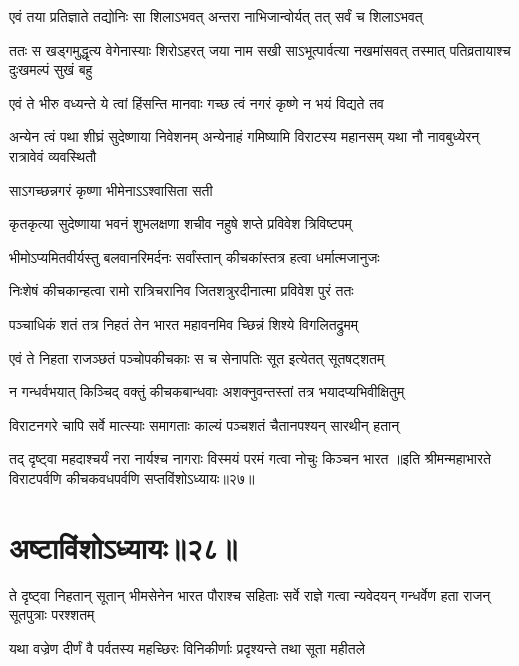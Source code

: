 \twolineshloka
{एवं तया प्रतिज्ञाते तद्योनिः सा शिलाऽभवत्}
{अन्तरा नाभिजान्वोर्यत् तत् सर्वं च शिलाऽभवत्}


\onelineshloka
{ततः स खड्गमुद्धृत्य वेगेनास्याः शिरोऽहरत्}
\twolineshloka
{जया नाम सखी साऽभूत्पार्वत्या नखमांसवत्}
{तस्मात् पतिव्रतायाश्च दुःखमल्पं सुखं बहु}


\twolineshloka
{एवं ते भीरु वध्यन्ते ये त्वां हिंसन्ति मानवाः}
{गच्छ त्वं नगरं कृष्णे न भयं विद्यते तव}


\threelineshloka
{अन्येन त्वं पथा शीघ्रं सुदेष्णाया निवेशनम्}
{अन्येनाहं गमिष्यामि विराटस्य महानसम्}
{यथा नौ नावबुध्येरन् रात्रावेवं व्यवस्थितौ}



\onelineshloka
{साऽगच्छन्नगरं कृष्णा भीमेनाऽऽश्वासिता सती}

\twolineshloka
{कृतकृत्या सुदेष्णाया भवनं शुभलक्षणा}
{शचीव नहुषे शप्ते प्रविवेश त्रिविष्टपम्}

\twolineshloka
{भीमोऽप्यमितवीर्यस्तु बलवानरिमर्दनः}
{सर्वांस्तान् कीचकांस्तत्र हत्वा धर्मात्मजानुजः}

\twolineshloka
{निःशेषं कीचकान्हत्वा रामो रात्रिचरानिव}
{जितशत्रुरदीनात्मा प्रविवेश पुरं ततः}

\twolineshloka
{पञ्चाधिकं शतं तत्र निहतं तेन भारत}
{महावनमिव च्छिन्नं शिश्ये विगलितद्रुमम्}

\twolineshloka
{एवं ते निहता राजञ्छतं पञ्चोपकीचकाः}
{स च सेनापतिः सूत इत्येतत् सूतषट्शतम्}

\twolineshloka
{न गन्धर्वभयात् किञ्चिद् वक्तुं कीचकबान्धवाः}
{अशक्नुवन्तस्तां तत्र भयादप्यभिवीक्षितुम्}

\twolineshloka
{विराटनगरे चापि सर्वे मात्स्याः समागताः}
{काल्यं पञ्चशतं चैतानपश्यन् सारथीन् हतान्}

\twolineshloka
{तद् दृष्ट्वा महदाश्चर्यं नरा नार्यश्च नागराः}
{विस्मयं परमं गत्वा नोचुः किञ्चन भारत}
॥इति श्रीमन्महाभारते विराटपर्वणि कीचकवधपर्वणि सप्तविंशोऽध्यायः॥२७॥

\chapter{अष्टाविंशोऽध्यायः॥२८॥}

\threelineshloka
{ते दृष्ट्वा निहतान् सूतान् भीमसेनेन भारत}
{पौराश्च सहिताः सर्वे राज्ञे गत्वा न्यवेदयन्}
{गन्धर्वेण हता राजन् सूतपुत्राः परश्शतम्}


\twolineshloka
{यथा वज्रेण दीर्णं वै पर्वतस्य महच्छिरः}
{विनिकीर्णाः प्रदृश्यन्ते तथा सूता महीतले}


